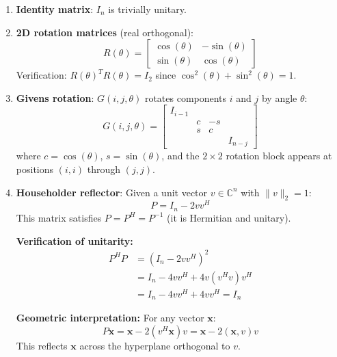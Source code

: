 \begin{enumerate}
    \item \textbf{Identity matrix}: $I_n$ is trivially unitary.

    \item \textbf{2D rotation matrices} (real orthogonal):
          \begin{equation}
              R(\theta) = \begin{bmatrix}
                  \cos(\theta) & -\sin(\theta) \\
                  \sin(\theta) & \cos(\theta)
              \end{bmatrix}
          \end{equation}
          Verification: $R(\theta)^T R(\theta) = I_2$ since $\cos^2(\theta) + \sin^2(\theta) = 1$.

    \item \textbf{Givens rotation}: $G(i,j,\theta)$ rotates components $i$ and $j$ by angle $\theta$:
          \begin{equation}
              G(i,j,\theta) = \begin{bmatrix}
                  I_{i-1} &   &    &         \\
                          & c & -s &         \\
                          & s & c  &         \\
                          &   &    & I_{n-j}
              \end{bmatrix}
          \end{equation}
          where $c = \cos(\theta)$, $s = \sin(\theta)$, and the $2 \times 2$ rotation block appears at positions $(i,i)$ through $(j,j)$.

    \item \textbf{Householder reflector}: Given a unit vector $v \in \mathbb{C}^n$ with $\|v\|_2 = 1$:
          \begin{equation}
              P = I_n - 2 v v^H
          \end{equation}
          This matrix satisfies $P = P^H = P^{-1}$ (it is Hermitian and unitary).

          \textbf{Verification of unitarity:}
          \begin{align}
              P^H P & = (I_n - 2 v v^H)^2               \\
                    & = I_n - 4 v v^H + 4 v (v^H v) v^H \\
                    & = I_n - 4 v v^H + 4 v v^H = I_n
          \end{align}

          \textbf{Geometric interpretation:} For any vector $\mathbf{x}$:
          \begin{equation}
              P \mathbf{x} = \mathbf{x} - 2 (v^H \mathbf{x}) v = \mathbf{x} - 2 (\mathbf{x}, v) v
          \end{equation}
          This reflects $\mathbf{x}$ across the hyperplane orthogonal to $v$.
\end{enumerate}

